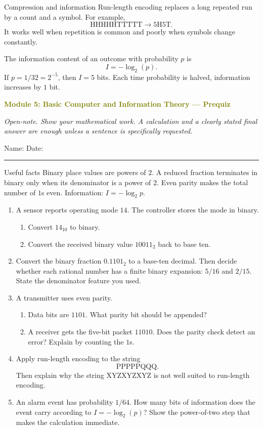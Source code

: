 \documentclass[11pt]{article}
\newcommand{\prequizhead}[2]{%
  \clearpage
  {\Large\bfseries\textcolor{olive}{Module #1: #2 — Prequiz}}\par
  \textit{Open-note. Show your mathematical work. A calculation and a clearly stated final answer are enough unless a sentence is specifically requested.}\par
  Name: \hspace{2.6in} Date: \hspace{1.1in}\par
  \vspace{2pt}\textcolor{gold}{\rule{\linewidth}{1.2pt}}\par\smallskip
}
\newcommand{\workmed}{\par\vspace{0.62in}}
\newcommand{\worklarge}{\par\vspace{0.92in}}
\begin{document}
\begin{keybox}{Compression and information}
Run-length encoding replaces a long repeated run by a count and a symbol. For example,
\[
\text{HHHHHTTTTT}\longrightarrow 5\text{H}5\text{T}.
\]
It works well when repetition is common and poorly when symbols change constantly.

The information content of an outcome with probability \(p\) is
\[
I=-\log_2(p).
\]
If \(p=1/32=2^{-5}\), then \(I=5\) bits. Each time probability is halved, information increases by \(1\) bit.
\end{keybox}

\prequizhead{5}{Basic Computer and Information Theory}
\begin{refbox}{Useful facts}
Binary place values are powers of \(2\). A reduced fraction terminates in binary only when its denominator is a power of \(2\). Even parity makes the total number of \(1\)s even. Information: \(I=-\log_2 p\).
\end{refbox}

\begin{enumerate}
\item A sensor reports operating mode \(14\). The controller stores the mode in binary.
\begin{enumerate}[label=(\alph*),itemsep=4pt]
\item Convert \(14_{10}\) to binary.
\item Convert the received binary value \(10011_2\) back to base ten.
\end{enumerate}
\worklarge

\item Convert the binary fraction \(0.1101_2\) to a base-ten decimal. Then decide whether each rational number has a finite binary expansion: \(5/16\) and \(2/15\). State the denominator feature you used.
\worklarge

\item A transmitter uses even parity.
\begin{enumerate}[label=(\alph*),itemsep=4pt]
\item Data bits are \(1101\). What parity bit should be appended?
\item A receiver gets the five-bit packet \(11010\). Does the parity check detect an error? Explain by counting the \(1\)s.
\end{enumerate}
\worklarge

\item Apply run-length encoding to the string
\[
\text{PPPPPQQQ}.
\]
Then explain why the string \(\text{XYZXYZXYZ}\) is not well suited to run-length encoding.
\worklarge

\item An alarm event has probability \(1/64\). How many bits of information does the event carry according to \(I=-\log_2(p)\)? Show the power-of-two step that makes the calculation immediate.
\workmed
\end{enumerate}
\end{document}

